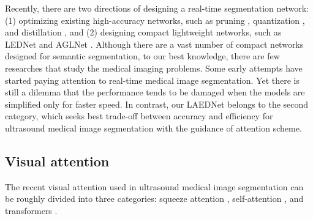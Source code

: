 \documentclass[review]{elsarticle}
\begin{document}
Recently, there are two directions of designing a real-time segmentation network: (1) optimizing existing high-accuracy networks, such as pruning \cite{wen2016learning,li2018constrained}, quantization \cite{wu2016quantized,nan2019deep}, and distillation \cite{liu2019structured,qin2021eff,ho2020utilize}, and (2) designing compact lightweight networks, such as LEDNet \cite{wang2019lednet} and AGLNet \cite{zhou2020aglnet}. Although there are a vast number of compact networks designed for semantic segmentation, to our best knowledge, there are few researches that study the medical imaging problems. Some early attempts \cite{qin2021eff,ho2020utilize,jha2021real} have started paying attention to real-time medical image segmentation. Yet there is still a dilemma that the performance tends to be damaged when the models are simplified only for faster speed. In contrast, our LAEDNet belongs to the second category, which seeks best trade-off between accuracy and efficiency for ultrasound medical image segmentation with the guidance of attention scheme.

\subsection{Visual attention}

The recent visual attention used in ultrasound medical image segmentation can be roughly divided into three categories: squeeze attention \cite{woo2018cbam,2017Squeeze}, self-attention \cite{2018non}, and transformers \cite{vaswani2017attention}.
	
\end{document}

